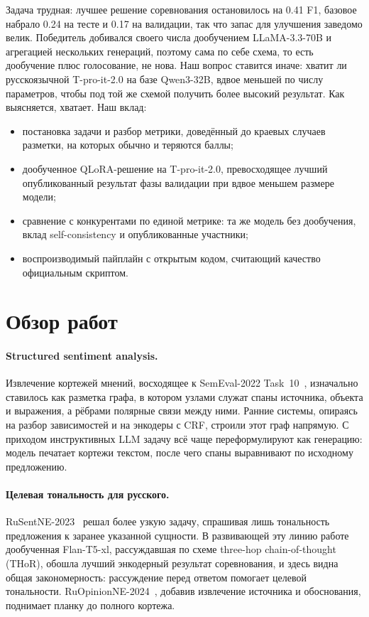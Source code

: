 \documentclass[11pt]{article}
\begin{document}
Задача трудная: лучшее решение соревнования остановилось на 0.41 F1, базовое набрало 0.24 на тесте и 0.17 на
валидации, так что запас для улучшения заведомо велик. Победитель добивался своего числа дообучением
LLaMA-3.3-70B и агрегацией нескольких генераций, поэтому сама по себе схема, то есть дообучение плюс голосование,
не нова. Наш вопрос ставится иначе: хватит ли русскоязычной T-pro-it-2.0 на базе Qwen3-32B, вдвое меньшей по
числу параметров, чтобы под той же схемой получить более высокий результат. Как выясняется, хватает. Наш вклад:
\begin{itemize}
\item постановка задачи и разбор метрики, доведённый до краевых случаев разметки, на которых обычно и теряются баллы;
\item дообученное QLoRA-решение на T-pro-it-2.0, превосходящее лучший опубликованный результат фазы валидации при вдвое меньшем размере модели;
\item сравнение с конкурентами по единой метрике: та же модель без дообучения, вклад self-consistency и опубликованные участники;
\item воспроизводимый пайплайн с открытым кодом, считающий качество официальным скриптом.
\end{itemize}

\section{Обзор работ}
\paragraph{Structured sentiment analysis.}
Извлечение кортежей мнений, восходящее к SemEval-2022 Task~10~\cite{barnes2022semeval}, изначально ставилось
как разметка графа, в котором узлами служат спаны источника, объекта и выражения, а рёбрами полярные связи между
ними. Ранние системы, опираясь на разбор зависимостей и на энкодеры с CRF, строили этот граф напрямую. С приходом
инструктивных LLM задачу всё чаще переформулируют как генерацию: модель печатает кортежи текстом, после чего спаны
выравнивают по исходному предложению.

\paragraph{Целевая тональность для русского.}
RuSentNE-2023~\cite{rusentne2023} решал более узкую задачу, спрашивая лишь тональность предложения к заранее
указанной сущности. В развивающей эту линию работе~\cite{thor2024} дообученная Flan-T5-xl, рассуждавшая
по схеме three-hop chain-of-thought (THoR), обошла лучший энкодерный результат соревнования, и здесь видна общая
закономерность: рассуждение перед ответом помогает целевой тональности. RuOpinionNE-2024~\cite{ruopinionne2024},
добавив извлечение источника и обоснования, поднимает планку до полного кортежа.
\end{document}
